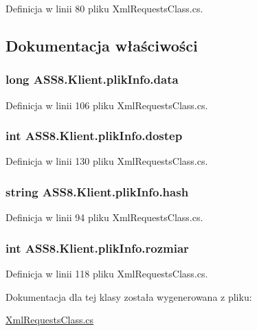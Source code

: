 Definicja w linii 80 pliku XmlRequestsClass.cs.

\subsection{Dokumentacja właściwości}
\hypertarget{a00018_169c26c2a6ea0c035eed3aa84d8c26ba}{
\subsubsection[{data}]{\setlength{\rightskip}{0pt plus 5cm}long ASS8.Klient.plikInfo.data}}
\label{d1/d2b/a00018_169c26c2a6ea0c035eed3aa84d8c26ba}




Definicja w linii 106 pliku XmlRequestsClass.cs.\hypertarget{a00018_dd38176b1c4fdc58d99da35f4a797e37}{
\subsubsection[{dostep}]{\setlength{\rightskip}{0pt plus 5cm}int ASS8.Klient.plikInfo.dostep}}
\label{d1/d2b/a00018_dd38176b1c4fdc58d99da35f4a797e37}




Definicja w linii 130 pliku XmlRequestsClass.cs.\hypertarget{a00018_3e622ab36164671a70caeeee3adb910d}{
\subsubsection[{hash}]{\setlength{\rightskip}{0pt plus 5cm}string ASS8.Klient.plikInfo.hash}}
\label{d1/d2b/a00018_3e622ab36164671a70caeeee3adb910d}




Definicja w linii 94 pliku XmlRequestsClass.cs.\hypertarget{a00018_e87d445327b832a69930c10f5555bf53}{
\subsubsection[{rozmiar}]{\setlength{\rightskip}{0pt plus 5cm}int ASS8.Klient.plikInfo.rozmiar}}
\label{d1/d2b/a00018_e87d445327b832a69930c10f5555bf53}




Definicja w linii 118 pliku XmlRequestsClass.cs.

Dokumentacja dla tej klasy została wygenerowana z pliku:\begin{CompactItemize}
\item 
\hyperlink{a00055}{XmlRequestsClass.cs}\end{CompactItemize}
